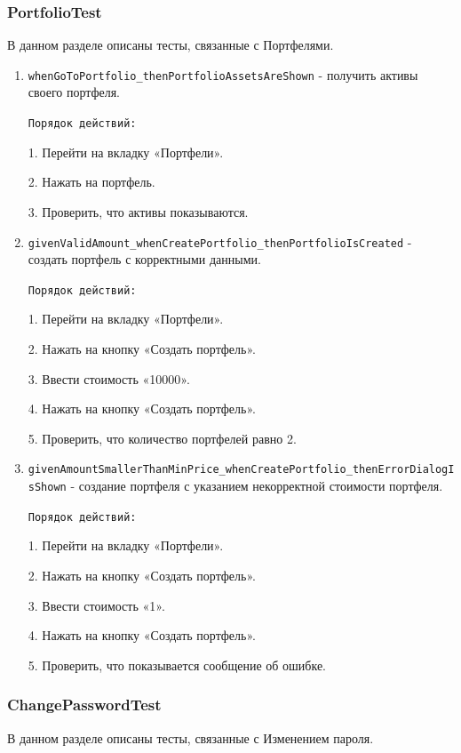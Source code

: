 \documentclass[a4paper, 14pt]{article}
\begin{document}
\subsubsection{PortfolioTest}

В данном разделе описаны тесты, связанные с Портфелями.

\begin{enumerate}
    \item \texttt{whenGoToPortfolio\_thenPortfolioAssetsAreShown} - получить активы своего портфеля.

    \texttt{Порядок действий:}
    
    1. Перейти на вкладку «Портфели».
    
    2. Нажать на портфель.

    3. Проверить, что активы показываются.
    \item \texttt{givenValidAmount\_whenCreatePortfolio\_thenPortfolioIsCreated} - создать портфель с корректными данными.

    \texttt{Порядок действий:}
    
    1. Перейти на вкладку «Портфели».
    
    2. Нажать на кнопку «Создать портфель».

    3. Ввести стоимость «10000».

    4. Нажать на кнопку «Создать портфель».

    5. Проверить, что количество портфелей равно 2.
    \item \texttt{givenAmountSmallerThanMinPrice\_whenCreatePortfolio\_thenErrorDialogIsShown} - создание портфеля с указанием некорректной стоимости портфеля.

    \texttt{Порядок действий:}
    
    1. Перейти на вкладку «Портфели».
    
    2. Нажать на кнопку «Создать портфель».

    3. Ввести стоимость «1».

    4. Нажать на кнопку «Создать портфель».

    5. Проверить, что показывается сообщение об ошибке.
    
\end{enumerate}

\subsubsection{ChangePasswordTest}

В данном разделе описаны тесты, связанные с Изменением пароля.
\end{document}
